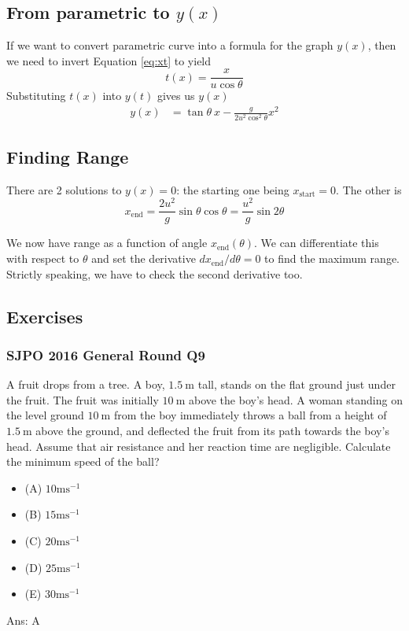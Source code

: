 \documentclass{article}
\begin{document}
\subsection{From parametric to $y(x)$}
If we want to convert parametric curve into a formula for the graph $y(x)$, then we need to invert Equation \ref{eq:xt} to yield $$t(x) = {\frac{x}{u \cos \theta}}$$
Substituting $t(x)$ into $y(t)$ gives us $y(x)$
\begin{align}
    y(x) &= \tan \theta\ x - \frac{g}{2u^2 \cos^2 \theta} x^2
\end{align}
\subsection{Finding Range}
There are 2 solutions to $y(x) = 0$: the starting one being $x_{\text{start}}=0$. The other is 
$$x_{\text{end}} = \frac{2u^2}{g} \sin \theta \cos \theta = \frac{u^2}{g} \sin 2\theta$$

We now have range as a function of angle $x_{\text{end}}(\theta)$. We can differentiate this with respect to $\theta$ and set the derivative $dx_{\text{end}}/d\theta = 0$ to find the maximum range. Strictly speaking, we have to check the second derivative too.
\subsection{Exercises}
\begin{samepage}
\subsubsection{SJPO 2016 General Round Q9}
A fruit drops from a tree. A boy, $1.5 \mathrm{~m}$ tall, stands on the flat ground just under the fruit. The fruit was initially $10 \mathrm{~m}$ above the boy's head. A woman standing on the level ground $10 \mathrm{~m}$ from the boy immediately throws a ball from a height of $1.5 \mathrm{~m}$ above the ground, and deflected the fruit from its path towards the boy's head. Assume that air resistance and her reaction time are negligible. Calculate the minimum speed of the ball?
\begin{itemize}
\item[](A) $10 \mathrm{ms}^{-1}$
\item[](B) $15 \mathrm{ms}^{-1}$
\item[](C) $20 \mathrm{ms}^{-1}$
\item[](D) $25 \mathrm{ms}^{-1}$
\item[](E) $30 \mathrm{ms}^{-1}$
\end{itemize}
Ans: \ifpaper A \fi \\[10pt]
\end{samepage}
\end{document}
